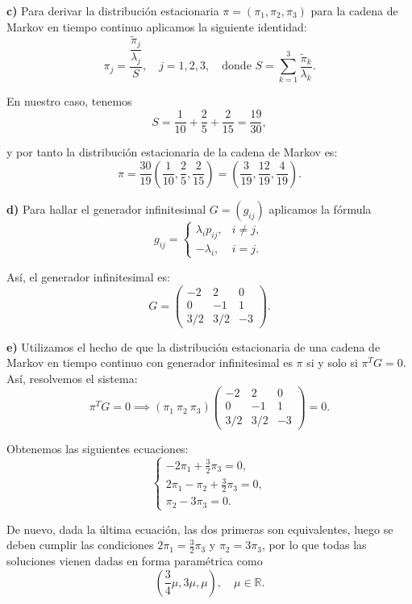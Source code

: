 \documentclass[12pt]{article}
\begin{document}
\textbf{c)} Para derivar la distribución estacionaria $\pi=(\pi_1, \pi_2, \pi_3)$ para la cadena de Markov en tiempo continuo aplicamos la siguiente identidad:
\begin{equation}
  \label{eq:estacionaria}
\pi_j=\frac{\dfrac{\tilde \pi_j}{\lambda_j}}{S}, \quad j=1,2,3, \quad \text{donde } S = \sum_{k=1}^3 \frac{\tilde \pi_k}{\lambda_k}.
\end{equation}

En nuestro caso, tenemos
\[
S=\frac{1}{10} + \frac{2}{5} + \frac{2}{15} = \frac{19}{30},
\]

y por tanto la distribución estacionaria de la cadena de Markov es:
\[
\pi=\frac{30}{19}\left( \frac{1}{10}, \frac{2}{5}, \frac{2}{15}\right) = \left( \frac{3}{19}, \frac{12}{19}, \frac{4}{19}\right).
\]

\textbf{d)} Para hallar el generador infinitesimal $G=(g_{ij})$ aplicamos la fórmula
\[
g_{ij}=\begin{cases}
  \lambda_ip_{ij}, & i\neq j,\\
  -\lambda_i, & i=j.
\end{cases}
\]

Así, el generador infinitesimal es:
\[
G=\begin{pmatrix}
  -2 & 2 & 0\\
  0 & -1 & 1\\
  3/2 & 3/2 & -3
\end{pmatrix}.
\]

\textbf{e)} Utilizamos el hecho de que la distribución estacionaria de una cadena de Markov en tiempo continuo con generador infinitesimal es $\pi$ si y solo si $\pi^TG=0$. Así, resolvemos el sistema:
\[
\pi^TG=0 \implies (\pi_1 \ \pi_2 \ \pi_3)\begin{pmatrix}
  -2 & 2 & 0\\
  0 & -1 & 1\\
  3/2 & 3/2 & -3
\end{pmatrix} = 0.
\]

Obtenemos las siguientes ecuaciones:
\[
\begin{cases}
  \displaystyle -2\pi_1 + \frac{3}{2}\pi_3=0,\\
  \displaystyle 2\pi_1 -\pi_2+\frac{3}{2}\pi_3=0,\\
  \displaystyle \pi_2-3\pi_3=0.
\end{cases}
\]

De nuevo, dada la última ecuación, las dos primeras son equivalentes, luego se deben cumplir las condiciones $2\pi_1=\frac{3}{2}\pi_3$ y $\pi_2=3\pi_3$, por lo que todas las soluciones vienen dadas en forma paramétrica como
\[
\left(\frac{3}{4}\mu, 3\mu, \mu \right), \quad \mu \in \mathbb R.
\]
\end{document}
